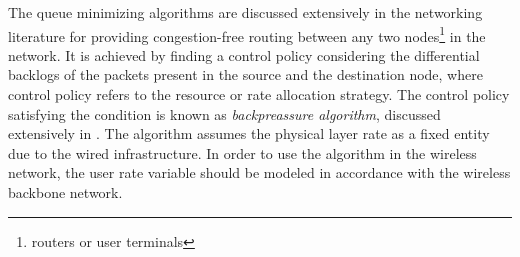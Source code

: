 
The queue minimizing algorithms are discussed extensively in the networking literature for providing congestion-free routing between any two nodes\footnote{routers or user terminals} in the network. It is achieved by finding a control policy considering the differential backlogs of the packets present in the source and the destination node, where control policy refers to the resource or rate allocation strategy. The control policy satisfying the condition is known as \emph{backpreassure algorithm}, discussed extensively in \cite{tassiulas,georgiadis2006resource,neely2010stochastic}. The algorithm assumes the physical layer rate as a fixed entity due to the wired infrastructure. In order to use the algorithm in the wireless network, the user rate variable  should be modeled in accordance with the wireless backbone network.

